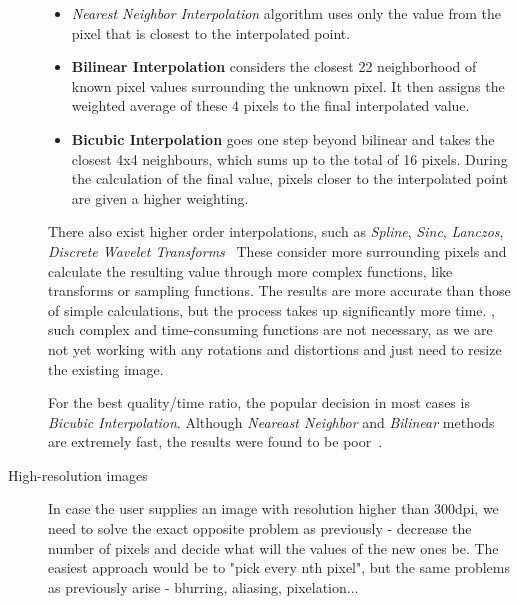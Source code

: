 \begin{description}
\begin{itemize}
\item \emph{Nearest Neighbor Interpolation} algorithm uses only the value from the pixel that is closest to the interpolated point.

\item\textbf {Bilinear Interpolation } considers the closest 22 neighborhood of known pixel values surrounding the unknown pixel. It then assigns the weighted average of these 4 pixels to the final interpolated value.

\item\textbf {Bicubic Interpolation } goes one step beyond bilinear and takes the closest 4x4 neighbours, which sums up to the total of 16 pixels. During the calculation of the final value, pixels closer to the interpolated point are given a higher weighting.

\end{itemize}

There also exist higher order interpolations, such as \emph{Spline}, \emph{Sinc}, \emph{Lanczos}, \emph{Discrete Wavelet Transforms}~\cite{interpolation} These consider more surrounding pixels and calculate the resulting value through more complex functions, like transforms or sampling functions. The results are more accurate than those of simple calculations, but  the process takes up significantly more time. , such complex and time-consuming functions are not necessary, as we are not yet working with any rotations and distortions and just need to resize the existing image.

For the best quality/time ratio, the popular decision in most cases is \emph{Bicubic Interpolation}. Although \emph{Neareast Neighbor} and \emph{Bilinear} methods are extremely fast, the results were found to be poor~\cite{interpolationComp}.

\item[High-resolution images] In case the user supplies an image with resolution higher than 300dpi, we need to solve the exact opposite problem as previously - decrease the number of pixels and decide what will the values of the new ones be. The easiest approach would be to "pick every nth pixel", but the same problems as previously arise - blurring, aliasing, pixelation...


\end{description}
